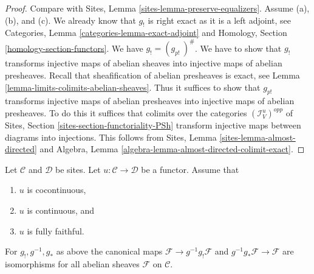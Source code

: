 \begin{proof}
Compare with
Sites, Lemma \ref{sites-lemma-preserve-equalizers}.
Assume (a), (b), and (c).
We already know that $g_!$ is right exact as it is a left adjoint, see
Categories, Lemma \ref{categories-lemma-exact-adjoint} and
Homology, Section \ref{homology-section-functors}.
We have $g_! = (g_{p!}\ )^\#$. We have to show that
$g_!$ transforms injective maps of abelian sheaves into injective maps
of abelian presheaves.
Recall that sheafification of abelian presheaves is exact, see
Lemma \ref{lemma-limits-colimits-abelian-sheaves}.
Thus it suffices to show that $g_{p!}$ transforms injective maps of
abelian presheaves into injective maps of abelian presheaves.
To do this it suffices that colimits over the categories
$(\mathcal{I}_V^u)^{opp}$ of
Sites, Section \ref{sites-section-functoriality-PSh}
transform injective maps between diagrams into injections.
This follows from
Sites, Lemma \ref{sites-lemma-almost-directed}
and
Algebra, Lemma \ref{algebra-lemma-almost-directed-colimit-exact}.
\end{proof}

\begin{lemma}
\label{lemma-back-and-forth}
Let $\mathcal{C}$ and $\mathcal{D}$ be sites.
Let $u : \mathcal{C} \to \mathcal{D}$ be a functor.
Assume that
\begin{enumerate}
\item[(a)] $u$ is cocontinuous,
\item[(b)] $u$ is continuous, and
\item[(c)] $u$ is fully faithful.
\end{enumerate}
For $g_!, g^{-1}, g_*$ as above the canonical maps
$\mathcal{F} \to g^{-1}g_!\mathcal{F}$ and
$g^{-1}g_*\mathcal{F} \to \mathcal{F}$
are isomorphisms
for all abelian sheaves $\mathcal{F}$ on $\mathcal{C}$.
\end{lemma}

